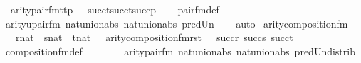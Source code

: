\begin{isabellebody}
\ \ arity{\isacharparenleft}{\kern0pt}pair{\isacharunderscore}{\kern0pt}fm{\isacharparenleft}{\kern0pt}t{}{\isacharcomma}{\kern0pt}t{}{\isacharcomma}{\kern0pt}p{\isacharparenright}{\kern0pt}{\isacharparenright}{\kern0pt}\ {\isacharequal}{\kern0pt}\ {\isasymUnion}\ {\isacharbraceleft}{\kern0pt}succ{\isacharparenleft}{\kern0pt}t{}{\isacharparenright}{\kern0pt}{\isacharcomma}{\kern0pt}succ{\isacharparenleft}{\kern0pt}t{}{\isacharparenright}{\kern0pt}{\isacharcomma}{\kern0pt}succ{\isacharparenleft}{\kern0pt}p{\isacharparenright}{\kern0pt}{\isacharbraceright}{\kern0pt}{\isachardoublequoteclose}\isanewline
%
\isadelimproof
\ \ %
\endisadelimproof
%
\isatagproof
{}\isamarkupfalse%
\ pair{\isacharunderscore}{\kern0pt}fm{\isacharunderscore}{\kern0pt}def\ \isanewline
\ \ \isamarkupfalse%
\ arity{\isacharunderscore}{\kern0pt}upair{\isacharunderscore}{\kern0pt}fm\ nat{\isacharunderscore}{\kern0pt}union{\isacharunderscore}{\kern0pt}abs{}\ nat{\isacharunderscore}{\kern0pt}union{\isacharunderscore}{\kern0pt}abs{}\ pred{\isacharunderscore}{\kern0pt}Un\isanewline
\ \ \isamarkupfalse%
\ auto%
\endisatagproof
{\isafoldproof}%
%
\isadelimproof
\isanewline
%
\endisadelimproof
\isanewline
{}\isamarkupfalse%
\ arity{\isacharunderscore}{\kern0pt}composition{\isacharunderscore}{\kern0pt}fm\ {\isacharcolon}{\kern0pt}\isanewline
\ \ {\isachardoublequoteopen}{\isasymlbrakk}\ r{\isasymin}nat\ {\isacharsemicolon}{\kern0pt}\ s{\isasymin}nat\ {\isacharsemicolon}{\kern0pt}\ t{\isasymin}nat\ {\isasymrbrakk}\ {\isasymLongrightarrow}\ arity{\isacharparenleft}{\kern0pt}composition{\isacharunderscore}{\kern0pt}fm{\isacharparenleft}{\kern0pt}r{\isacharcomma}{\kern0pt}s{\isacharcomma}{\kern0pt}t{\isacharparenright}{\kern0pt}{\isacharparenright}{\kern0pt}\ {\isacharequal}{\kern0pt}\ {\isasymUnion}\ {\isacharbraceleft}{\kern0pt}succ{\isacharparenleft}{\kern0pt}r{\isacharparenright}{\kern0pt}{\isacharcomma}{\kern0pt}\ succ{\isacharparenleft}{\kern0pt}s{\isacharparenright}{\kern0pt}{\isacharcomma}{\kern0pt}\ succ{\isacharparenleft}{\kern0pt}t{\isacharparenright}{\kern0pt}{\isacharbraceright}{\kern0pt}{\isachardoublequoteclose}\isanewline
%
\isadelimproof
\ \ %
\endisadelimproof
%
\isatagproof
{}\isamarkupfalse%
\ composition{\isacharunderscore}{\kern0pt}fm{\isacharunderscore}{\kern0pt}def\ \ \ \ \isanewline
\ \ \isamarkupfalse%
\ arity{\isacharunderscore}{\kern0pt}pair{\isacharunderscore}{\kern0pt}fm\ nat{\isacharunderscore}{\kern0pt}union{\isacharunderscore}{\kern0pt}abs{}\ nat{\isacharunderscore}{\kern0pt}union{\isacharunderscore}{\kern0pt}abs{}\ pred{\isacharunderscore}{\kern0pt}Un{\isacharunderscore}{\kern0pt}distrib\isanewline

\end{isabellebody}
